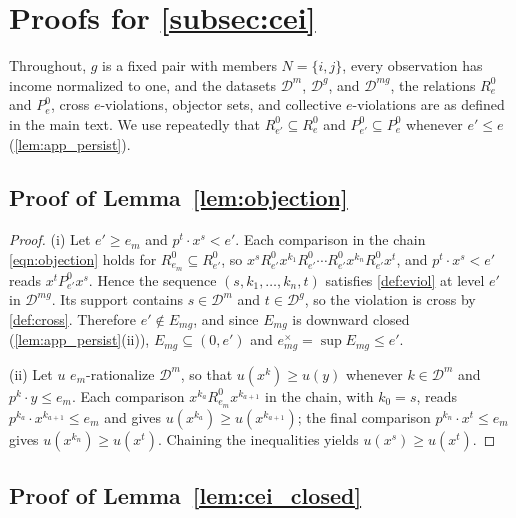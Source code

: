 \documentclass[11 pt]{article}
\begin{document}
\newpage

\section{Proofs for \autoref{subsec:cei}}\label{appendix:cei}

Throughout, $g$ is a fixed pair with members $N = \{i,j\}$, every observation has income normalized to one, and the datasets $\mathcal{D}^{m}$, $\mathcal{D}^{g}$, and $\mathcal{D}^{mg}$, the relations $R^{0}_{e}$ and $P^{0}_{e}$, cross $e$-violations, objector sets, and collective $e$-violations are as defined in the main text. We use repeatedly that $R^{0}_{e'} \subseteq R^{0}_{e}$ and $P^{0}_{e'} \subseteq P^{0}_{e}$ whenever $e' \leq e$ (\autoref{lem:app_persist}).

\subsection{Proof of Lemma~\ref{lem:objection}}

\begin{proof}
(i) Let $e' \geq e_{m}$ and $p^{t} \cdot x^{s} < e'$. Each comparison in the chain \eqref{eqn:objection} holds for $R^{0}_{e_m} \subseteq R^{0}_{e'}$, so $x^{s} \mathrel{R^{0}_{e'}} x^{k_1} \mathrel{R^{0}_{e'}} \cdots \mathrel{R^{0}_{e'}} x^{k_n} \mathrel{R^{0}_{e'}} x^{t}$, and $p^{t} \cdot x^{s} < e'$ reads $x^{t} \mathrel{P^{0}_{e'}} x^{s}$. Hence the sequence $(s, k_1, \dots, k_n, t)$ satisfies \autoref{def:eviol} at level $e'$ in $\mathcal{D}^{mg}$. Its support contains $s \in \mathcal{D}^{m}$ and $t \in \mathcal{D}^{g}$, so the violation is cross by \autoref{def:cross}. Therefore $e' \notin E_{mg}$, and since $E_{mg}$ is downward closed (\autoref{lem:app_persist}(ii)), $E_{mg} \subseteq (0, e')$ and $e^{\times}_{mg} = \sup E_{mg} \leq e'$.

(ii) Let $u$ $e_{m}$-rationalize $\mathcal{D}^{m}$, so that $u(x^{k}) \geq u(y)$ whenever $k \in \mathcal{D}^{m}$ and $p^{k} \cdot y \leq e_{m}$. Each comparison $x^{k_a} \mathrel{R^{0}_{e_m}} x^{k_{a+1}}$ in the chain, with $k_{0} = s$, reads $p^{k_a} \cdot x^{k_{a+1}} \leq e_{m}$ and gives $u(x^{k_a}) \geq u(x^{k_{a+1}})$; the final comparison $p^{k_n} \cdot x^{t} \leq e_{m}$ gives $u(x^{k_n}) \geq u(x^{t})$. Chaining the inequalities yields $u(x^{s}) \geq u(x^{t})$.
\end{proof}

\subsection{Proof of Lemma~\ref{lem:cei_closed}}
\end{document}
